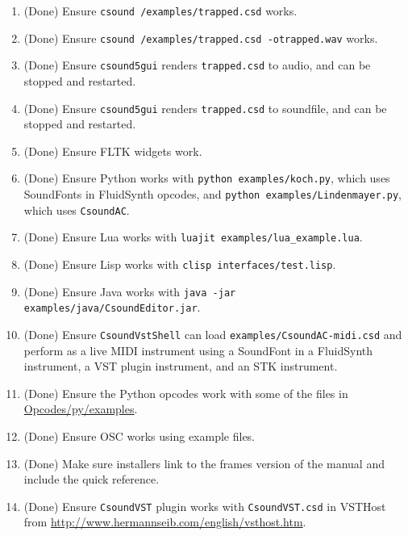 \documentclass[11pt,letterpaper,onecolumn]{scrartcl}
\begin{document}
\begin{sloppypar}
\begin{enumerate}
	\item (Done) Ensure \texttt{csound /examples/trapped.csd} works.
	\item (Done) Ensure \texttt{csound /examples/trapped.csd -otrapped.wav} works.
	\item (Done) Ensure \texttt{csound5gui} renders \texttt{trapped.csd} to audio, and can be stopped and restarted.
	\item (Done) Ensure \texttt{csound5gui} renders \texttt{trapped.csd} to soundfile, and can be stopped and restarted. 	
	\item (Done) Ensure FLTK widgets work. 	
	\item (Done) Ensure Python works with \texttt{python examples/koch.py}, which uses SoundFonts in FluidSynth opcodes, and \texttt{python examples/Lindenmayer.py}, which uses \texttt{CsoundAC}. 
	\item (Done) Ensure Lua works with \verb|luajit examples/lua_example.lua|.
	\item (Done) Ensure Lisp works with \verb|clisp interfaces/test.lisp|.
	\item (Done) Ensure Java works with \verb|java -jar examples/java/CsoundEditor.jar|.
	\item (Done) Ensure \texttt{CsoundVstShell} can load \texttt{examples/CsoundAC-midi.csd} and perform as a live MIDI instrument using a SoundFont in a FluidSynth instrument, a VST plugin instrument, and an STK instrument.
	\item (Done) Ensure the Python opcodes work with some of the files in \url{Opcodes/py/examples}.
	\item (Done) Ensure OSC works using example files.
	\item (Done) Make sure installers link to the frames version of the manual and include the quick reference.
	\item (Done) Ensure \texttt{CsoundVST} plugin works with \texttt{CsoundVST.csd} in VSTHost from \url{http://www.hermannseib.com/english/vsthost.htm}.
\end{enumerate}

\end{sloppypar}
\end{document}
